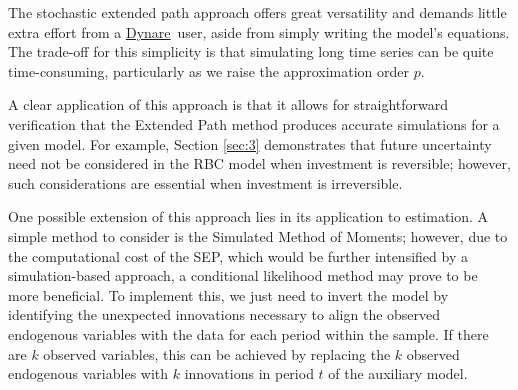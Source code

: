 \documentclass[a4paper,11pt]{amsart}
\makeatletter
\newcommand{\addresseshere}{%
  \enddoc@text\let\enddoc@text\relax
}
\newcommand{\Dynare}{\href{http://www.dynare.org}{Dynare}}
\makeatother
\begin{document}
The stochastic extended path approach offers great versatility and
demands little extra effort from a \Dynare\, user, aside from simply
writing the model's equations. The trade-off for this simplicity is
that simulating long time series can be quite time-consuming,
particularly as we raise the approximation order $p$.\newline

A clear application of this approach is that it allows for
straightforward verification that the Extended Path method produces
accurate simulations for a given model. For example, Section
\ref{sec:3} demonstrates that future uncertainty need not be
considered in the RBC model when investment is reversible; however,
such considerations are essential when investment is irreversible.\newline

One possible extension of this approach lies in its application to
estimation. A simple method to consider is the Simulated Method of
Moments; however, due to the computational cost of the SEP, which
would be further intensified by a simulation-based approach, a
conditional likelihood method may prove to be more beneficial. To
implement this, we just need to invert the model by identifying the
unexpected innovations necessary to align the observed endogenous
variables with the data for each period within the sample. If there
are \( k \) observed variables, this can be achieved by replacing
the \( k \) observed endogenous variables with \( k \) innovations in
period \( t \) of the auxiliary model.\newline


\addresseshere


\newpage
\appendix
\end{document}
